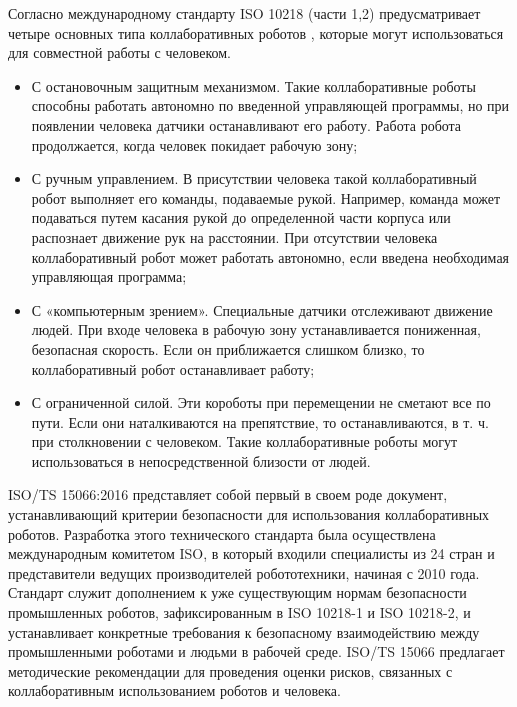 Согласно международному стандарту ISO 10218 (части 1,2)  предусматривает четыре основных типа коллаборативных роботов \citep{robotiqWhatDoes}, которые могут использоваться для совместной работы с человеком.
\begin{itemize}
	\item  С остановочным защитным механизмом. Такие коллаборативные роботы способны работать автономно по введенной управляющей программы, но при появлении человека датчики останавливают его работу. Работа робота продолжается, когда человек покидает рабочую зону;
	\item С ручным управлением. В присутствии человека такой коллаборативный робот выполняет его команды, подаваемые рукой. Например, команда может подаваться путем касания рукой до определенной части корпуса или распознает движение рук на расстоянии. При отсутствии человека коллаборативный робот может работать автономно, если введена необходимая управляющая программа;
	\item  С «компьютерным зрением». Специальные датчики отслеживают движение людей. При входе человека в рабочую зону устанавливается пониженная, безопасная скорость. Если он приближается слишком близко, то коллаборативный робот останавливает работу;
	\item С ограниченной силой. Эти короботы при перемещении не сметают все по пути. Если они наталкиваются на препятствие, то останавливаются, в т. ч. при столкновении с человеком. Такие коллаборативные роботы могут использоваться в непосредственной близости от людей.
\end{itemize}


ISO/TS 15066:2016 представляет собой первый в своем роде документ, устанавливающий критерии безопасности для использования коллаборативных роботов. Разработка этого технического стандарта была осуществлена международным комитетом ISO, в который входили специалисты из 24 стран и представители ведущих производителей робототехники, начиная с 2010 года. Стандарт служит дополнением к уже существующим нормам безопасности промышленных роботов, зафиксированным в ISO 10218-1 и ISO 10218-2, и устанавливает конкретные требования к безопасному взаимодействию между промышленными роботами и людьми в рабочей среде. ISO/TS 15066 предлагает методические рекомендации для проведения оценки рисков, связанных с коллаборативным использованием роботов и человека.


